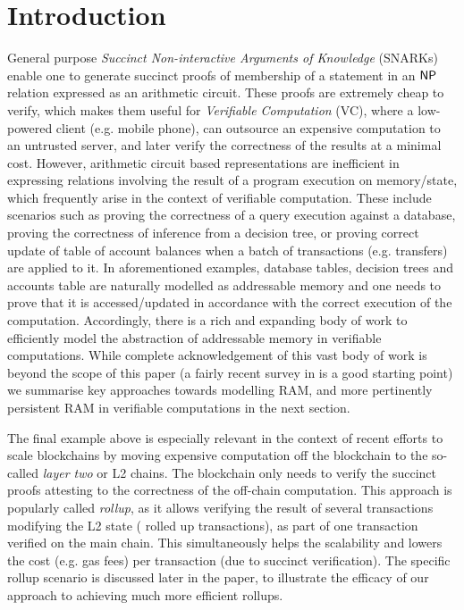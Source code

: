 \documentclass[11pt]{article}
\begin{document}
    \section{Introduction}\label{sec:introduction}
    General purpose {\em Succinct Non-interactive Arguments of Knowledge} (SNARKs) enable one to generate succinct
    proofs of membership of a statement in an $\mathsf{NP}$ relation expressed as an arithmetic circuit. These proofs are
    extremely cheap to verify, which makes them useful for {\em Verifiable Computation} (VC), where a low-powered
    client (e.g. mobile phone), can outsource an expensive computation to an untrusted server, and later
    verify the correctness of the results at a minimal cost.
    However,
    arithmetic circuit based representations are inefficient in expressing relations involving the result of
    a program execution on memory/state, which frequently arise in the context of verifiable computation.
    These include scenarios such as proving the correctness of a query execution against a database,
    proving the correctness of inference
    from a decision tree, or proving correct update of table of account balances when a batch of transactions (e.g. transfers)
    are applied to it.
    In aforementioned examples, database tables, decision trees and accounts table are naturally
    modelled as addressable memory and one needs to prove that it is accessed/updated in accordance with the correct execution
    of the computation. Accordingly, there is a rich and expanding body of work to efficiently model the abstraction of
    addressable memory in verifiable computations. While complete acknowledgement of this vast body of work is beyond
    the scope of this paper (a fairly recent survey in \cite{WB15} is a good starting point) we summarise key approaches towards modelling RAM, and more pertinently persistent RAM
    in verifiable computations in the next section.


    The final example above is especially relevant in the context of recent efforts to scale blockchains
    by moving expensive computation off the blockchain to the so-called {\em layer two} or L2 chains. The blockchain
    only needs to verify the succinct proofs attesting to the correctness of the off-chain computation. This approach
    is popularly called {\em rollup}, as it allows verifying the result of several transactions modifying the L2 state (
    rolled up transactions), as part of one transaction verified on the main chain. This simultaneously helps the scalability
    and lowers the cost (e.g. gas fees) per transaction (due to succinct verification). The specific rollup scenario
    is discussed later in the paper, to illustrate the efficacy of our approach to achieving much more efficient rollups.
\end{document}
